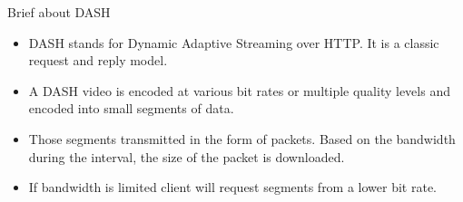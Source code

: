 \documentclass{beamer}
\begin{document}

\begin{frame}{Brief about DASH}
    \begin{itemize}
        \item DASH stands for Dynamic Adaptive Streaming over HTTP. It is a classic request and reply model.
        \item A DASH video is encoded at various bit rates or multiple quality levels and encoded into small segments of data.
        \item Those segments transmitted in the form of packets. Based on the bandwidth during the interval, the size of the packet is downloaded.
        \item If bandwidth is limited client will request segments from a lower bit rate.
    \end{itemize}
\end{frame}
\end{document}
